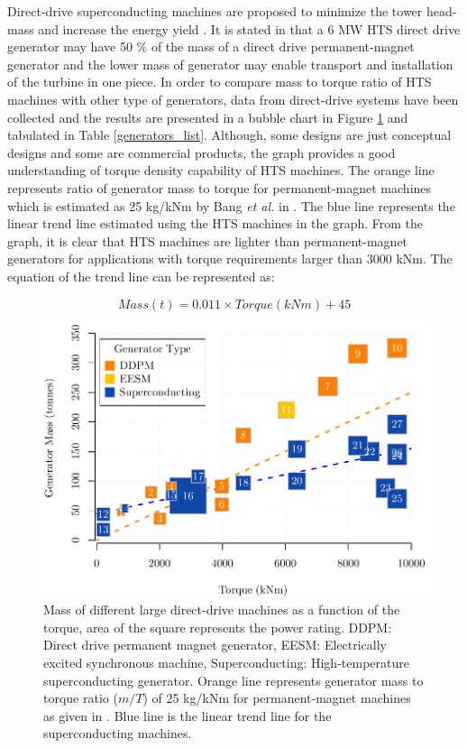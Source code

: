 \documentclass[12pt]{iopart}
\begin{document}
Direct-drive superconducting machines are proposed to minimize the tower head-mass and increase the energy yield \cite{Lesser2009, Lewis2007, Kalsi2004a}. It is stated in \cite{Lewis2007} that a 6 MW HTS direct drive generator may have 50 \% of the mass of a direct drive permanent-magnet generator and the lower mass of generator may enable transport and installation of the turbine in one piece.
In order to compare mass to torque ratio of HTS machines with other type of generators, data from direct-drive systems have been collected and the results are presented in a bubble chart in Figure \ref{generators_mass_comparison} and tabulated in Table \ref{generators_list}. Although, some designs are just conceptual designs and some are commercial products, the graph provides a good understanding of torque density capability of HTS machines.  The orange line represents ratio of generator mass to torque for permanent-magnet machines which is estimated as 25 kg/kNm by Bang \textit{et al.} in \cite{Bang2008}. The blue line represents the linear trend line estimated using the HTS machines in the graph. From the graph, it is clear that HTS machines are lighter than permanent-magnet generators for applications with torque requirements larger than 3000 kNm. The equation of the trend line can be represented as:

 \begin{equation}
     Mass(t)=0.011\times Torque(kNm)+45
     \label{mass_torque_eq}
 \end{equation}

\begin{figure}[]
\centering
\includegraphics[]{generator_mass_compare}
\caption{Mass of different large direct-drive machines as a function of the torque, area of the square represents the power rating.
 DDPM: Direct drive permanent magnet generator, EESM: Electrically excited synchronous machine, Superconducting: High-temperature superconducting generator. Orange line represents generator mass to torque ratio ($m/T$) of 25 kg/kNm for permanent-magnet machines as given in \cite{Bang2008}. Blue line is the linear trend line for the superconducting machines.}
\label{generators_mass_comparison}
\end{figure}
\end{document}
